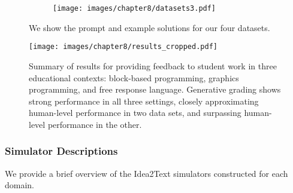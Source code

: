 \begin{figure}[t!]
    \centering
    \begin{subfigure}{\linewidth}
        \centering
        \texttt{[image: images/chapter8/datasets3.pdf]}
    \end{subfigure}
    \caption{ We show the prompt and example solutions for our four datasets.}
    \label{fig:grading_problem}
\end{figure}

\begin{figure}[h!]
    \centering
        \texttt{[image: images/chapter8/results\_cropped.pdf]}
    \caption{ Summary of results for providing feedback to student work in three educational contexts: block-based programming, graphics programming, and free response language. Generative grading shows strong performance in all three settings, closely approximating human-level performance in two data sets, and surpassing human-level performance in the other.}
    \label{fig:results_summary}
\end{figure} 

\subsubsection{Simulator Descriptions}

We provide a brief overview of the Idea2Text simulators constructed for each domain.

